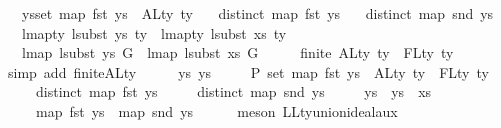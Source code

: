 \begin{isabellebody}
\ \ \ {\isachardoublequoteopen}{\isasymexists}ys{\isachardot}{\kern0pt}{\isacharparenleft}{\kern0pt}set\ {\isacharparenleft}{\kern0pt}map\ fst\ ys{\isacharparenright}{\kern0pt}\ {\isacharequal}{\kern0pt}\ ALty\ ty\isanewline
\ \ {\isasymand}\ distinct\ {\isacharparenleft}{\kern0pt}map\ fst\ ys{\isacharparenright}{\kern0pt}\isanewline
\ \ {\isasymand}\ distinct\ {\isacharparenleft}{\kern0pt}map\ snd\ ys{\isacharparenright}{\kern0pt}\isanewline
\ \ {\isasymand}\ lmap{\isacharunderscore}{\kern0pt}ty\ {\isacharparenleft}{\kern0pt}lsubst\ ys{\isacharparenright}{\kern0pt}\ ty\ {\isacharequal}{\kern0pt}\ lmap{\isacharunderscore}{\kern0pt}ty\ {\isacharparenleft}{\kern0pt}lsubst\ xs{\isacharparenright}{\kern0pt}\ ty\isanewline
\ \ {\isasymand}\ lmap\ {\isacharparenleft}{\kern0pt}lsubst\ ys{\isacharparenright}{\kern0pt}\ G\ {\isacharequal}{\kern0pt}\ lmap\ {\isacharparenleft}{\kern0pt}lsubst\ xs{\isacharparenright}{\kern0pt}\ G{\isacharparenright}{\kern0pt}{\isachardoublequoteclose}\isanewline
%
\isadelimproof
%
\endisadelimproof
%
\isatagproof
{}\isamarkupfalse%
\ {\isacharminus}{\kern0pt}\isanewline
\ \ \isamarkupfalse%
\ {\isachardoublequoteopen}finite\ {\isacharparenleft}{\kern0pt}ALty\ ty\ {\isacharminus}{\kern0pt}\ FLty\ ty{\isacharparenright}{\kern0pt}{\isachardoublequoteclose}\isanewline
\ \ \ \ \isamarkupfalse%
\ {\isacharparenleft}{\kern0pt}simp\ add{\isacharcolon}{\kern0pt}\ finite{\isacharunderscore}{\kern0pt}ALty{\isacharparenright}{\kern0pt}\isanewline
\ \ \isamarkupfalse%
\ \isamarkupfalse%
\ ys\ ys{}\ \isanewline
\ \ \ \ P{}{\isacharcolon}{\kern0pt}\ {\isachardoublequoteopen}set\ {\isacharparenleft}{\kern0pt}map\ fst\ ys{}{\isacharparenright}{\kern0pt}\ {\isacharequal}{\kern0pt}\ ALty\ ty\ {\isacharminus}{\kern0pt}\ FLty\ ty\isanewline
\ \ \ \ {\isasymand}\ distinct\ {\isacharparenleft}{\kern0pt}map\ fst\ ys{}{\isacharparenright}{\kern0pt}\isanewline
\ \ \ \ {\isasymand}\ distinct\ {\isacharparenleft}{\kern0pt}map\ snd\ ys{}{\isacharparenright}{\kern0pt}\isanewline
\ \ \ \ {\isasymand}\ ys\ {\isacharequal}{\kern0pt}\ ys{}\ {\isacharat}{\kern0pt}\ xs\isanewline
\ \ \ \ {\isasymand}\ map\ fst\ ys{}\ {\isacharequal}{\kern0pt}\ map\ snd\ ys{}{\isachardoublequoteclose}\isanewline
\ \ \ \ \isamarkupfalse%
\ {\isacharparenleft}{\kern0pt}meson\ LLty{\isacharunderscore}{\kern0pt}union{\isacharunderscore}{\kern0pt}ideal{\isacharunderscore}{\kern0pt}aux{\isacharparenright}{\kern0pt}\isanewline

\end{isabellebody}
